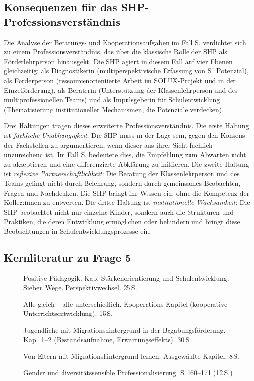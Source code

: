 \documentclass[ngerman, a4paper]{article}
\begin{document}
\subsection{Konsequenzen für das SHP-Professionsverständnis}

Die Analyse der Beratungs- und Kooperationsaufgaben im Fall S. verdichtet sich
zu einem Professionsverständnis, das über die klassische Rolle der SHP als
Förderlehrperson hinausgeht. Die SHP agiert in diesem Fall auf vier Ebenen
gleichzeitig: als Diagnostikerin (multiperspektivische Erfassung von S.'
Potenzial), als Förderperson (ressourcenorientierte Arbeit im SOLUX-Projekt und
in der Einzelförderung), als Beraterin (Unterstützung der Klassenlehrperson und
des multiprofessionellen Teams) und als Impulsgeberin für Schulentwicklung
(Thematisierung institutioneller Mechanismen, die Potenziale verdecken).

Drei Haltungen tragen dieses erweiterte Professionsverständnis. Die erste
Haltung ist \textit{fachliche Unabhängigkeit}: Die SHP muss in der Lage sein,
gegen den Konsens der Fachstellen zu argumentieren, wenn dieser aus ihrer Sicht
fachlich unzureichend ist. Im Fall S. bedeutete dies, die Empfehlung zum
Abwarten nicht zu akzeptieren und eine differenzierte Abklärung zu initiieren.
Die zweite Haltung ist \textit{reflexive Partnerschaftlichkeit}: Die Beratung
der Klassenlehrperson und des Teams gelingt nicht durch Belehrung, sondern
durch gemeinsames Beobachten, Fragen und Nachdenken. Die SHP bringt ihr Wissen
ein, ohne die Kompetenz der Kolleg:innen zu entwerten. Die dritte Haltung ist
\textit{institutionelle Wachsamkeit}: Die SHP beobachtet nicht nur einzelne
Kinder, sondern auch die Strukturen und Praktiken, die deren Entwicklung
ermöglichen oder behindern und bringt diese Beobachtungen in
Schulentwicklungsprozesse ein.

\subsection{Kernliteratur zu Frage 5}
 
\begin{description}
  \item[\cite{burow2021positive}] Positive Pädagogik. Kap. Stärkenorientierung
    und Schulentwicklung. Sieben Wege, Perspektivwechsel. 25\,S.
  \item[\cite{buholzer2010allegleich}] Alle gleich -- alle unterschiedlich.
    Kooperations-Kapitel (kooperative Unterrichtsentwicklung). 15\,S.
  \item[\cite{leikhof2021jugendliche}] Jugendliche mit Migrationshintergrund
    in der Begabungsförderung. Kap.~1--2 (Bestandsaufnahme,
    Erwartungseffekte). 30\,S.
  \item[\cite{kosoroklabhart2021voneltern}] Von Eltern mit
    Migrationshintergrund lernen. Ausgewählte Kapitel. 8\,S.
  \item[\cite{macha2019gender}] Gender und diversitätssensible
    Professionalisierung. S.\,160--171 (12\,S.)
\end{description}
 
\end{document}

